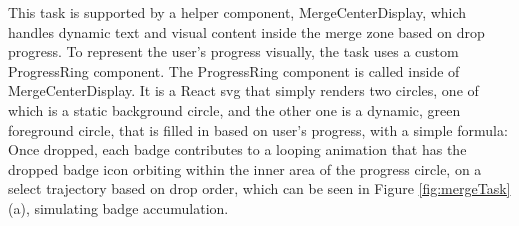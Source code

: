 This task is supported by a helper component, MergeCenterDisplay, which handles dynamic text and visual content inside the merge zone based on drop progress. 
To represent the user's progress visually, the task uses a custom 
ProgressRing component. 
The ProgressRing component is called inside of MergeCenterDisplay. 
It is a React \acrshort{svg} that simply renders two circles, one of which is a static background circle, and the other one is a dynamic, green foreground circle, that is filled in based on user's progress, with a simple formula:
Once dropped, each badge contributes to a looping animation that has the dropped badge icon orbiting within the inner area of the progress circle, on a select trajectory based on drop order, which can be seen in Figure \ref{fig:mergeTask} (a), simulating badge accumulation. 

